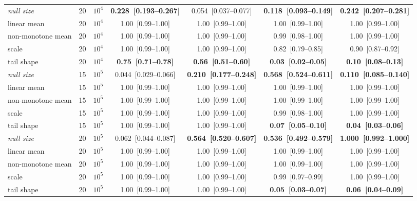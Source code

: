 {\begin{tabular}{llrcccc}
\midrule
\emph{null size} & 20 & $10^4$ & \textbf{0.228~[0.193--0.267]} & 0.054~[0.037--0.077] & \textbf{0.118~[0.093--0.149]} & \textbf{0.242~[0.207--0.281]} \\
linear mean & 20 & $10^4$ & 1.00~[0.99--1.00] & 1.00~[0.99--1.00] & 1.00~[0.99--1.00] & 1.00~[0.99--1.00] \\
non-monotone mean & 20 & $10^4$ & 1.00~[0.99--1.00] & 1.00~[0.99--1.00] & 0.99~[0.98--1.00] & 1.00~[0.99--1.00] \\
scale & 20 & $10^4$ & 1.00~[0.99--1.00] & 1.00~[0.99--1.00] & 0.82~[0.79--0.85] & 0.90~[0.87--0.92] \\
tail shape & 20 & $10^4$ & \textbf{0.75~[0.71--0.78]} & \textbf{0.56~[0.51--0.60]} & \textbf{0.03~[0.02--0.05]} & \textbf{0.10~[0.08--0.13]} \\
\midrule
\emph{null size} & 15 & $10^5$ & 0.044~[0.029--0.066] & \textbf{0.210~[0.177--0.248]} & \textbf{0.568~[0.524--0.611]} & \textbf{0.110~[0.085--0.140]} \\
linear mean & 15 & $10^5$ & 1.00~[0.99--1.00] & 1.00~[0.99--1.00] & 1.00~[0.99--1.00] & 1.00~[0.99--1.00] \\
non-monotone mean & 15 & $10^5$ & 1.00~[0.99--1.00] & 1.00~[0.99--1.00] & 1.00~[0.99--1.00] & 1.00~[0.99--1.00] \\
scale & 15 & $10^5$ & 1.00~[0.99--1.00] & 1.00~[0.99--1.00] & 0.99~[0.98--1.00] & 1.00~[0.99--1.00] \\
tail shape & 15 & $10^5$ & 1.00~[0.99--1.00] & 1.00~[0.99--1.00] & \textbf{0.07~[0.05--0.10]} & \textbf{0.04~[0.03--0.06]} \\
\midrule
\emph{null size} & 20 & $10^5$ & 0.062~[0.044--0.087] & \textbf{0.564~[0.520--0.607]} & \textbf{0.536~[0.492--0.579]} & \textbf{1.000~[0.992--1.000]} \\
linear mean & 20 & $10^5$ & 1.00~[0.99--1.00] & 1.00~[0.99--1.00] & 1.00~[0.99--1.00] & 1.00~[0.99--1.00] \\
non-monotone mean & 20 & $10^5$ & 1.00~[0.99--1.00] & 1.00~[0.99--1.00] & 1.00~[0.99--1.00] & 1.00~[0.99--1.00] \\
scale & 20 & $10^5$ & 1.00~[0.99--1.00] & 1.00~[0.99--1.00] & 0.99~[0.97--0.99] & 1.00~[0.99--1.00] \\
tail shape & 20 & $10^5$ & 1.00~[0.99--1.00] & 1.00~[0.99--1.00] & \textbf{0.05~[0.03--0.07]} & \textbf{0.06~[0.04--0.09]} \\
\bottomrule
\end{tabular}}
